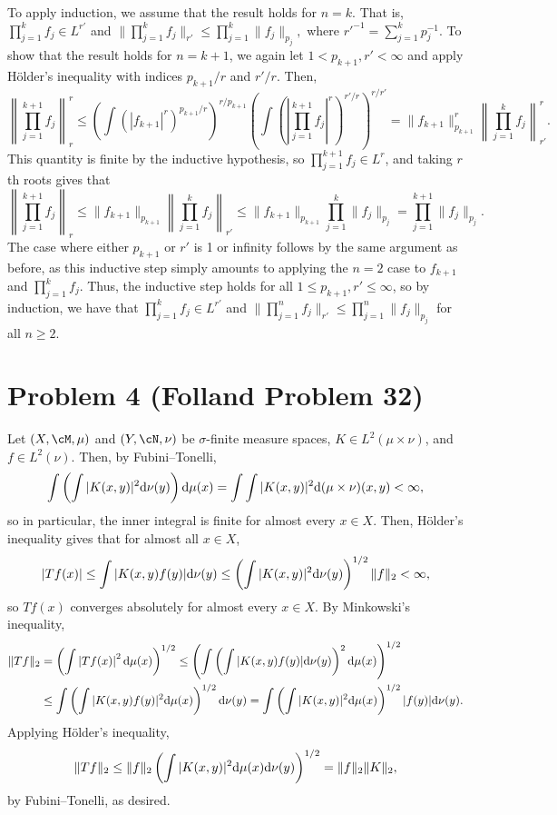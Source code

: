 \documentclass{article}
\begin{document}
To apply induction, we assume that the result holds for $n=k$. That is, $\prod_{j=1}^{k}f_j\in L^{r'}$ and $\|\prod_{j=1}^{k}f_j\|_{r'}\leq\prod_{j=1}^{k}\|f_j\|_{p_j},$ where $r'^{-1}=\sum_{j=1}^k p_j^{-1}$. To show that the result holds for $n=k+1$, we again let $1<p_{k+1},r'<\infty$ and apply H\"older's inequality with indices $p_{k+1}/r$ and $r'/r$. Then,
\[
\left\|\prod_{j=1}^{k+1}f_j\right\|^r_r\leq\left(\int\left(|f_{k+1}|^r\right)^{p_{k+1}/r}\right)^{r/p_{k+1}}\left(\int\left(\left|\prod_{j=1}^{k+1}f_j\right|^r\right)^{r'/r}\right)^{r/r'}=\|f_{k+1}\|_{p_{k+1}}^r\left\|\prod_{j=1}^{k}f_j\right\|^r_{r'}.
\]
This quantity is finite by the inductive hypothesis, so $\prod_{j=1}^{k+1}f_j\in L^{r}$, and taking $r$th roots gives that
\[
\left\|\prod_{j=1}^{k+1}f_j\right\|_r\leq\|f_{k+1}\|_{p_{k+1}}\left\|\prod_{j=1}^{k}f_j\right\|_{r'}\leq\|f_{k+1}\|_{p_{k+1}}\prod_{j=1}^{k}\|f_j\|_{p_j}=\prod_{j=1}^{k+1}\|f_j\|_{p_j}.
\]
The case where either $p_{k+1}$ or $r'$ is 1 or infinity follows by the same argument as before, as this inductive step simply amounts to applying the $n=2$ case to $f_{k+1}$ and $\prod_{j=1}^{k}f_j$. Thus, the inductive step holds for all $1\leq p_{k+1},r'\leq\infty$, so by induction, we have that $\prod_{j=1}^{k}f_j\in L^{r'}$ and $\|\prod_{j=1}^{n}f_j\|_{r'}\leq\prod_{j=1}^{n}\|f_j\|_{p_j}$ for all $n\geq 2$.

\section{Problem 4 (Folland Problem 32)}
Let $(X,\cM,\mu)$ and $(Y,\cN,\nu)$ be $\sigma$-finite measure spaces, $K\in L^2(\mu\times\nu)$, and $f\in L^2(\nu)$. Then, by Fubini--Tonelli,
\[
\int\left(\int|K(x,y)|^2\mathrm{d}\nu(y)\right)\mathrm{d}\mu(x)=\int\int|K(x,y)|^2\mathrm{d}(\mu\times\nu)(x,y)<\infty,
\]
so in particular, the inner integral is finite for almost every $x\in X$. Then, H\"older's inequality gives that for almost all $x\in X$,
\[
|Tf(x)|\leq\int|K(x,y)f(y)|\mathrm{d}\nu(y)\leq\left(\int|K(x,y)|^2\mathrm{d}\nu(y)\right)^{1/2}\|f\|_2<\infty,
\]
so $Tf(x)$ converges absolutely for almost every $x\in X$. By Minkowski's inequality,
\begin{align*}
\|Tf\|_2&=\left(\int\left|Tf(x)\right|^2\mathrm{d}\mu(x)\right)^{1/2}\leq\left(\int\left(\int|K(x,y)f(y)|\mathrm{d}\nu(y)\right)^2\mathrm{d}\mu(x)\right)^{1/2}\\&\leq\int\left(\int|K(x,y)f(y)|^2\mathrm{d}\mu(x)\right)^{1/2}\mathrm{d}\nu(y)=\int\left(\int|K(x,y)|^2\mathrm{d}\mu(x)\right)^{1/2}|f(y)|\mathrm{d}\nu(y).
\end{align*}
Applying H\"older's inequality,
\[
\|Tf\|_2\leq \|f\|_2\left(\int|K(x,y)|^2\mathrm{d}\mu(x)\mathrm{d}\nu(y)\right)^{1/2}=\|f\|_2\|K\|_2,
\]
by Fubini--Tonelli, as desired. 
\end{document}
